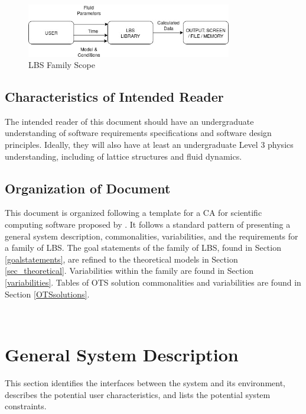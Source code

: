 \documentclass[12pt]{article}
\begin{document}
\begin{figure}[h!]
\begin{center}
\includegraphics[width=0.8\textwidth]{SystemContext}
\caption{LBS Family Scope}
\label{Fig_SystemContext}
\end{center}
\end{figure}

\subsection{Characteristics of Intended Reader} 

The intended reader of this document should have an undergraduate understanding of software requirements specifications and software design principles. Ideally, they will also have at least an undergraduate Level 3 physics understanding, including of lattice structures and fluid dynamics.

\subsection{Organization of Document}

This document is organized following a template for a CA for scientific computing software proposed by \citet{smith2006systematic}. It follows a standard pattern of presenting a general system description, commonalities, variabilities, and the requirements for a family of LBS. The goal statements of the family of LBS, found in Section \ref{goalstatements}, are refined to the theoretical models in Section \ref{sec_theoretical}. Variabilities within the family are found in Section \ref{variabilities}. Tables of OTS solution commonalities and variabilities are found in Section \ref{OTSsolutions}.

~\newpage

\section{General System Description}

This section identifies the interfaces between the system and its environment,
describes the potential user characteristics, and lists the potential system
constraints.
\end{document}
